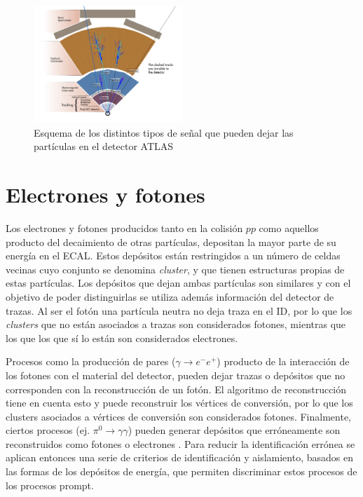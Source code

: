 \begin{figure}
\centering
  \includegraphics[width=0.5\textwidth]{images/cross_section_2-eps-converted-to.pdf}
\caption{Esquema de los distintos tipos de señal que pueden dejar las partículas en el detector ATLAS 
\commentNotaIII 
}
\label{particulasATLAS}
\end{figure}

\section{Electrones y fotones}


Los electrones y fotones producidos tanto en la colisión $pp$ como aquellos producto del decaimiento de otras partículas, depositan la mayor parte de su energía en el ECAL. Estos depósitos están restringidos a un número de celdas vecinas cuyo conjunto se denomina \textit{cluster}, y que tienen estructuras propias de estas partículas. Los depósitos que dejan ambas partículas son similares y con el objetivo de poder distinguirlas se utiliza además información del detector de trazas. Al ser el fotón una partícula neutra no deja traza en el ID, por lo que los \textit{clusters} que no están asociados a trazas son considerados fotones, mientras que los que los que sí lo están son considerados electrones. 

Procesos como la producción de pares ($\gamma\to e^{-}e^{+}$) producto de la interacción de los fotones con el material del detector, pueden dejar trazas o depósitos que no corresponden con la reconstrucción de un fotón. El algoritmo de reconstrucción tiene en cuenta esto y puede reconstruir los vértices de conversión, por lo que los clusters asociados a vértices de conversión son considerados fotones. Finalmente, ciertos procesos (ej. $\pi^{0}\to\gamma\gamma$) pueden generar depósitos que erróneamente son reconstruidos como fotones o electrones
. Para reducir la identificación errónea se aplican entonces una serie de criterios de identificación y aislamiento, basados en las formas de los depósitos de energía, que permiten discriminar estos procesos de los procesos prompt.

